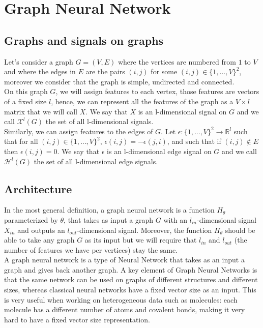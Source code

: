 \documentclass[12pt]{article}
\begin{document}
\newpage

\section{Graph Neural Network}

\subsection{Graphs and signals on graphs}
Let's consider a graph $G =(V,E)$ where the vertices are numbered from $1$ to $V$ and where the edges in $E$ are the pairs $(i,j)$ for some $(i, j) \in \{1,...,V\}^2$, moreover we consider that the graph is simple, undirected and connected.\\

On this graph $G$, we will assign features to each vertex, those features are vectors of a fixed size $l$, hence, we can represent all the features of the graph as a $V \times l$ matrix that we will call $X$. We say that $X$ is an l-dimensional signal on $G$ and we call $\mathcal{X}^l(G)$ the set of all l-dimensional signals.\\

Similarly, we can assign features to the edges of $G$. Let $\epsilon: \{1,...,V\}^2 \longrightarrow \mathbb{R}^l$ such that for all $(i,j) \in \{1,...,V\}^2$, $\epsilon(i,j) = - \epsilon(j,i)$, and such that if $(i,j) \not\in E$ then $\epsilon(i,j) = 0$. We say that $\epsilon$ is an l-dimensional edge signal on $G$ and we call $\mathcal{H}^l(G)$ the set of all l-dimensional edge signals.

\subsection{Architecture}

In the most general definition, a graph neural network is a function $H_{\theta}$ parameterized by $\theta$, that takes as input a graph $G$ with an $l_{in}$-dimensional signal $X_{in}$ and outputs an $l_{out}$-dimensional signal. Moreover, the function $H_{\theta}$ should be able to take any graph $G$ as its input but we will require that $l_{in}$ and $l_{out}$ (the number of features we have per vertices) stay the same.\\

A graph neural network is a type of Neural Network that takes as an input a graph and gives back another graph. A key element of Graph Neural Networks is that the same network can be used on graphs of different structures and different sizes, whereas classical neural networks have a fixed vector size as an input. This is very useful when working on heterogeneous data such as molecules: each molecule has a different number of atoms and covalent bonds, making it very hard to have a fixed vector size representation.\\
\end{document}
